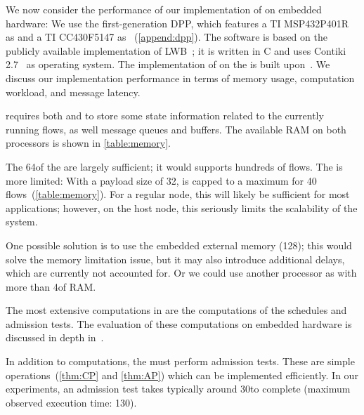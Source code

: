 We now consider the performance of our implementation of \DRP on embedded hardware: We use the first-generation DPP, which features a TI MSP432P401R as \AP and a TI CC430F5147 as \CP~(\cref{append:dpp}).
The software is based on the publicly available implementation of LWB~\cite{Code_LWB}; it is written in C and uses Contiki 2.7~\cite{contiki} as operating system.
The implementation of \blink on the \AP is built upon~\cite{acevedo2016Realtime}.
%
We discuss our implementation performance in terms of memory usage, computation workload, and message latency.

\DRP requires both \AP and \CP to store some state information related to the currently running flows, as well message queues and buffers. The available RAM on both processors is shown in \cref{table:memory}.

The 64\kB of the \AP are largely sufficient; it would supports hundreds of flows. The \CP is more limited: With a payload size of 32\bytes, \CP is capped to a maximum for 40 flows~(\cref{table:memory}). For a regular node, this will likely be sufficient for most applications; however, on the host node, this seriously limits the scalability of the system.

One possible solution is to use the embedded external memory (128\kB); this would solve the memory limitation issue, but it may also introduce additional delays, which are currently not accounted for. Or we could use another processor as \CP with more than 4\kB of RAM.

\begin{table}
	\centering
	\caption{Memory available and required for our implementation of \DRP.
	}
	\label{table:memory}
	{\smaller}
\end{table}


The most extensive computations in \DRP are the computations of the \blink schedules and admission tests. The evaluation of these computations on embedded hardware is discussed in depth in~\cite{zimmerling2017Blink}.

In addition to \blink computations, the \APs must perform \DRP admission tests. These are simple operations~(\cref{thm:CP} and \ref{thm:AP}) which can be implemented efficiently. In our experiments, an admission test takes typically around 30\ms to complete (maximum observed execution time: 130\ms).

